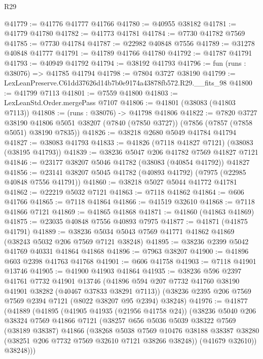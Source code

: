 \begin{lexlean}{R29}
\begin{coremodule}
@41779 := @41776 @41777 @41766
@41780 := @40955 @38182
@41781 := @41779 @41780
@41782 := @41773 @41781
@41784 := @7730 @41782 @7569
@41785 := @7730 @41784
@41787 := @22982 @40848 @7556
@41789 := @31278 @40848 @41777
@41791 := @41789 @41766 @41780
@41792 := @41787 @41791
@41793 := @40949 @41792
@41794 := @38192 @41793
@41796 := fun (runs : @38076) => @41785 @41794
@41798 := @7804 @3727 @38190
@41799 := LexLeanPreserve.C61dd37626d14b7b0e9174a43878fb572.R29.__fits_98
@41800 := @41799 @7113
@41801 := @7559 @41800
@41803 := LexLeanStd.Order.mergePass @7107
@41806 := @41801 (@38083 (@41803 @7113))
@41808 := (runs : @38076) -> @41798 @41806
@41822 := @7820
    @3727
    @38190
    @41806
    @5051
    @38207
    (@7840 (@7850 @3727))
    (@7856 (@7857 (@7858 @5051) @38190 @7835))
@41826 := @38218 @2680 @5049 @41784 @41794
@41827 := @38083 @41793
@41833 := @41826 (@7118 @41827 @7121) (@38083 (@38195 @41793))
@41839 := @38236 @5047 @206 @41782 @7569 @41827 @7121
@41846 := @23177 @38207 @5046 @41782 (@38083 (@40854 @41792)) @41827
@41856 := @23141 @38207 @5045 @41782 (@40893 @41792) (@7975 (@22985 @40848 @7556 @41791))
@41860 := @38218 @5027 @5044 @41772 @41781
@41862 := @22219 @5032 @7121
@41863 := @7118 @41862
@41864 := @606 @41766
@41865 := @7118 @41864
@41866 := @41519 @32610
@41868 := @7118 @41866 @7121
@41869 := @41865 @41868
@41871 := @41860 (@41863 @41869)
@41875 := @23035 @40848 @7556 @40893 @7975
@41877 := @41871 (@41875 @41791)
@41889 := @38236 @5034 @5043 @7569 @41771 @41862 @41869 (@38243 @5032 @206 @7569 @7121 @38248)
@41895 := @38236 @2399 @5042 @41769 @40331 @41864 @41868
@41896 := @7963 @38207
@41900 := @41896 @603 @2398 @41763 @41768
@41901 := @606 @41758
@41903 := @7118 @41901 @13746
@41905 := @41900 @41903 @41864
@41935 := @38236
    @596
    @2397
    @41761
    @7732
    @41901
    @13746
    (@41896 @594 @207 @7732 @41760 @38190 @41901 @38282 (@40467 @37833 @38291 @7113))
    (@38236 @2395 @206 @7569 @7569 @2394 @7121 (@8022 @38207 @95 @2394) @38248)
@41976 := @41877
    (@41889
      (@41895
        (@41905 @41935 (@21956 @41758 @24))
        (@38236
          @5040
          @206
          @38324
          @7569
          @41866
          @7121
          (@38257
            @656
            @5036
            @5039
            @38322
            @7569
            (@38189 @38387)
            @41866
            (@38268
              @5038
              @7569
              @10476
              @38188
              @38387
              @38280
              (@38251 @206 @7732 @7569 @32610 @7121 @38266 @38248))
            (@41679 @32610))
          @38248)))

\end{coremodule}
\end{lexlean}
